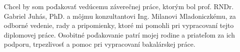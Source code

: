 Chcel by som poďakovať vedúcemu záverečnej práce, ktorým bol prof. RNDr. Gabriel Juhás, PhD. a môjmu konzultantovi Ing. Milanovi Mladoniczkému, za odborné vedenie, rady a pripomienky, ktoré mi pomohli pri vypracovaní tejto diplomovej práce. Osobitné poďakovanie patrí mojej rodine a priateľom za ich podporu, trpezlivosť a pomoc pri vypracovaní bakalárskej práce.